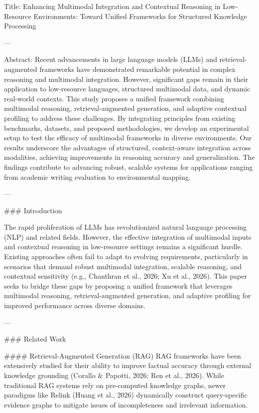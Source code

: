 Title: Enhancing Multimodal Integration and Contextual Reasoning in Low-Resource Environments: Toward Unified Frameworks for Structured Knowledge Processing

---

Abstract:  
Recent advancements in large language models (LLMs) and retrieval-augmented frameworks have demonstrated remarkable potential in complex reasoning and multimodal integration. However, significant gaps remain in their application to low-resource languages, structured multimodal data, and dynamic real-world contexts. This study proposes a unified framework combining multimodal reasoning, retrieval-augmented generation, and adaptive contextual profiling to address these challenges. By integrating principles from existing benchmarks, datasets, and proposed methodologies, we develop an experimental setup to test the efficacy of multimodal frameworks in diverse environments. Our results underscore the advantages of structured, context-aware integration across modalities, achieving improvements in reasoning accuracy and generalization. The findings contribute to advancing robust, scalable systems for applications ranging from academic writing evaluation to environmental mapping.

---

### Introduction  

The rapid proliferation of LLMs has revolutionized natural language processing (NLP) and related fields. However, the effective integration of multimodal inputs and contextual reasoning in low-resource settings remains a significant hurdle. Existing approaches often fail to adapt to evolving requirements, particularly in scenarios that demand robust multimodal integration, scalable reasoning, and contextual sensitivity (e.g., Chanthran et al., 2026; Xu et al., 2026). This paper seeks to bridge these gaps by proposing a unified framework that leverages multimodal reasoning, retrieval-augmented generation, and adaptive profiling for improved performance across diverse domains.  

---

### Related Work  

#### Retrieval-Augmented Generation (RAG)  
RAG frameworks have been extensively studied for their ability to improve factual accuracy through external knowledge grounding (Corallo & Papotti, 2026; Ren et al., 2026). While traditional RAG systems rely on pre-computed knowledge graphs, newer paradigms like Relink (Huang et al., 2026) dynamically construct query-specific evidence graphs to mitigate issues of incompleteness and irrelevant information.

